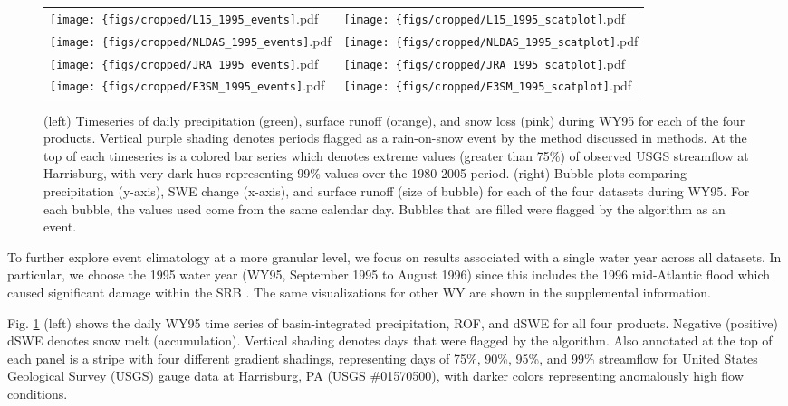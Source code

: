 \documentclass[draft]{agujournal2019}
\begin{document}
\begin{figure}
\centering
\begin{tabularx}{\textwidth}{XX}
\texttt{[image: \{figs/cropped/L15\_1995\_events]}.pdf} & \texttt{[image: \{figs/cropped/L15\_1995\_scatplot]}.pdf} \\ \texttt{[image: \{figs/cropped/NLDAS\_1995\_events]}.pdf} & \texttt{[image: \{figs/cropped/NLDAS\_1995\_scatplot]}.pdf} \\
    \texttt{[image: \{figs/cropped/JRA\_1995\_events]}.pdf} & \texttt{[image: \{figs/cropped/JRA\_1995\_scatplot]}.pdf} \\\texttt{[image: \{figs/cropped/E3SM\_1995\_events]}.pdf} & \texttt{[image: \{figs/cropped/E3SM\_1995\_scatplot]}.pdf}
\end{tabularx}
\caption{(left) Timeseries of daily precipitation (green), surface runoff (orange), and snow loss (pink) during WY95 for each of the four products. Vertical purple shading denotes periods flagged as a rain-on-snow event by the method discussed in methods. At the top of each timeseries is a colored bar series which denotes extreme values (greater than 75\%) of observed USGS streamflow at Harrisburg, with very dark hues representing 99\% values over the 1980-2005 period. (right) Bubble plots comparing precipitation (y-axis), SWE change (x-axis), and surface runoff (size of bubble) for each of the four datasets during WY95. For each bubble, the values used come from the same calendar day. Bubbles that are filled were flagged by the algorithm as an event.}
\label{fig:merged-wy}
\end{figure}

To further explore event climatology at a more granular level, we focus on results associated with a single water year across all datasets. In particular, we choose the 1995 water year (WY95, September 1995 to August 1996) since this includes the 1996 mid-Atlantic flood which caused significant damage within the SRB \citep{leathers1998severe}. The same visualizations for other WY are shown in the supplemental information.

Fig. \ref{fig:merged-wy} (left) shows the daily WY95 time series of basin-integrated precipitation, ROF, and dSWE for all four products. Negative (positive) dSWE denotes snow melt (accumulation). Vertical shading denotes days that were flagged by the algorithm. Also annotated at the top of each panel is a stripe with four different gradient shadings, representing days of 75\%, 90\%, 95\%, and 99\% streamflow for United States Geological Survey (USGS) gauge data at Harrisburg, PA (USGS \#01570500), with darker colors representing anomalously high flow conditions.
\end{document}
